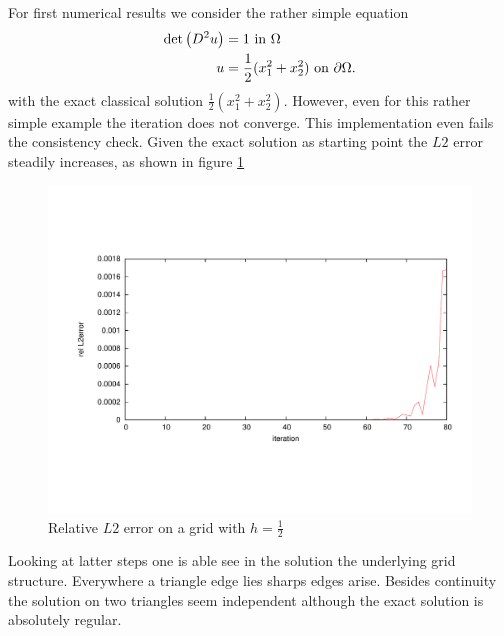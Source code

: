 For first numerical results we consider the rather simple equation
\begin{align}
	\det{\left(D^2 u\right)} &= 1 \text{ in } \Omega \\ 
	u &= \frac 1 2 (x_1^2 + x_2^2 )\text{ on }\partial \Omega.	
\end{align}
with the exact classical solution $\frac 1 2 (x_1^2 + x_2^2 )$. However, even for this rather simple example the iteration does not converge. This implementation even fails the consistency check. Given the exact solution as starting point the $L2$ error steadily increases, as shown in figure \ref{fig: consisctency_first_try}
\begin{figure}[h]
	\centering
	\includegraphics[trim = 2cm 4cm 1cm 4cm, width=1\textwidth]{plots/consisctency_first_try.pdf}
	\caption{Relative $L2$ error on a grid with $h=\frac 1 2$}
	\label{fig: consisctency_first_try}
\end{figure}
Looking at latter steps one is able see in the solution the underlying grid structure. Everywhere a triangle edge lies sharps edges arise. Besides continuity the solution on two triangles seem independent although the exact solution is absolutely  regular.

